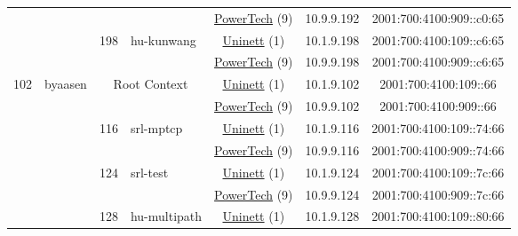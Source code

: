 \begin{small}
\begin{center}
\begin{longtable}{|c|c|c|c|c|c|c|c|}
  &  &  &  & \multicolumn{2}{|c|}{\tiny{\href{http://www.powertech.no}{PowerTech} (9)}} & \tiny{10.9.9.192} & \tiny{2001:700:4100:909::c0:65} \\* \cline{3-3}\cline{4-4}\cline{5-5}\cline{6-6}\cline{7-7}\cline{8-8}
  &  & \multirow{2}{*}{\tiny{198}} & \multicolumn{1}{|l|}{\multirow{2}{*}{\tiny{hu-kunwang}}} & \multicolumn{2}{|c|}{\tiny{\href{https://www.uninett.no}{Uninett} (1)}} & \tiny{10.1.9.198} & \tiny{2001:700:4100:109::c6:65} \\* \cline{5-5}\cline{6-6}\cline{7-7}\cline{8-8}
  &  &  &  & \multicolumn{2}{|c|}{\tiny{\href{http://www.powertech.no}{PowerTech} (9)}} & \tiny{10.9.9.198} & \tiny{2001:700:4100:909::c6:65} \\ \hline
 \multirow{24}{*}{\tiny{102}} & \multicolumn{1}{|l|}{\multirow{24}{*}{\tiny{byaasen}}} & \multicolumn{2}{|c|}{\multirow{2}{*}{\tiny{Root Context}}} & \multicolumn{2}{|c|}{\tiny{\href{https://www.uninett.no}{Uninett} (1)}} & \tiny{10.1.9.102} & \tiny{2001:700:4100:109::66} \\* \cline{5-5}\cline{6-6}\cline{7-7}\cline{8-8}
  &  & \multicolumn{2}{|c|}{} & \multicolumn{2}{|c|}{\tiny{\href{http://www.powertech.no}{PowerTech} (9)}} & \tiny{10.9.9.102} & \tiny{2001:700:4100:909::66} \\* \cline{3-3}\cline{4-4}\cline{5-5}\cline{6-6}\cline{7-7}\cline{8-8}
  &  & \multirow{2}{*}{\tiny{116}} & \multicolumn{1}{|l|}{\multirow{2}{*}{\tiny{srl-mptcp}}} & \multicolumn{2}{|c|}{\tiny{\href{https://www.uninett.no}{Uninett} (1)}} & \tiny{10.1.9.116} & \tiny{2001:700:4100:109::74:66} \\* \cline{5-5}\cline{6-6}\cline{7-7}\cline{8-8}
  &  &  &  & \multicolumn{2}{|c|}{\tiny{\href{http://www.powertech.no}{PowerTech} (9)}} & \tiny{10.9.9.116} & \tiny{2001:700:4100:909::74:66} \\* \cline{3-3}\cline{4-4}\cline{5-5}\cline{6-6}\cline{7-7}\cline{8-8}
  &  & \multirow{2}{*}{\tiny{124}} & \multicolumn{1}{|l|}{\multirow{2}{*}{\tiny{srl-test}}} & \multicolumn{2}{|c|}{\tiny{\href{https://www.uninett.no}{Uninett} (1)}} & \tiny{10.1.9.124} & \tiny{2001:700:4100:109::7c:66} \\* \cline{5-5}\cline{6-6}\cline{7-7}\cline{8-8}
  &  &  &  & \multicolumn{2}{|c|}{\tiny{\href{http://www.powertech.no}{PowerTech} (9)}} & \tiny{10.9.9.124} & \tiny{2001:700:4100:909::7c:66} \\* \cline{3-3}\cline{4-4}\cline{5-5}\cline{6-6}\cline{7-7}\cline{8-8}
  &  & \multirow{2}{*}{\tiny{128}} & \multicolumn{1}{|l|}{\multirow{2}{*}{\tiny{hu-multipath}}} & \multicolumn{2}{|c|}{\tiny{\href{https://www.uninett.no}{Uninett} (1)}} & \tiny{10.1.9.128} & \tiny{2001:700:4100:109::80:66} \\* \cline{5-5}\cline{6-6}\cline{7-7}\cline{8-8}

\end{longtable}
\end{center}
\end{small}

